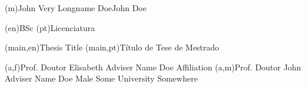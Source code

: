 
%



\ncauthorname(m){John Very Longname Doe}{John Doe}


\ncauthordegree(en){BSc}
\ncauthordegree(pt){Licenciatura}




\nctitle(main,en){Thesis Title}%
\nctitle(main,pt){Título de Tese de Mestrado}%



\ncmember(a,f){Prof. Doutor Elisabeth Adviser Name Doe}{ Affiliation} 
\ncmember(a,m){Prof. Doutor John Adviser Name Doe Male}{ Some University Somewhere}


